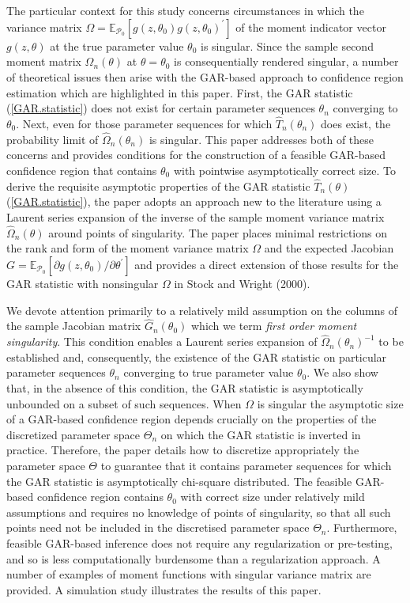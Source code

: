\documentclass[hidelinks, 11 pt, a4paper, pdflatex]{article}
\begin{document}
{  The particular context for this study concerns circumstances in which the variance matrix $\Omega = \mathbb{E}_{\mathcal{P}_0}[g(z,\theta_{0})g(z,\theta_{0})^{\prime}]$ of the moment indicator vector $g(z,\theta)$ at the true parameter value $\theta_0$ is singular. Since the sample second moment matrix $\hat{\Omega}_{n}(\theta)$ at $\theta = \theta_0$ is consequentially rendered singular, a number of theoretical issues then arise with the GAR-based approach to confidence region estimation which are highlighted in this paper. First, the GAR statistic (\ref{GAR.statistic}) does not exist for certain parameter sequences $\theta_n$ converging to $\theta_{0}$. Next, even for those parameter sequences for which $\hat{T}_n(\theta_n)$ does exist, the probability limit of $\hat{\Omega}_{n}(\theta_n)$ is singular. This paper addresses both of these concerns and provides conditions for the construction of a feasible GAR-based confidence region that contains $\theta_{0}$ with pointwise asymptotically correct size. To derive the requisite asymptotic properties of the GAR statistic $\hat{T}_n(\theta)$ (\ref{GAR.statistic}), the paper adopts an approach new to the literature using a Laurent series expansion of the inverse of the sample moment variance matrix $\hat{\Omega}_n(\theta)$ around points of singularity. The paper places minimal restrictions on the rank and form of the moment variance matrix $\Omega$ and the expected Jacobian $G = \mathbb{E}_{\mathcal{P}_0}[\partial g(z,\theta_{0})/ \partial \theta^{\prime}]$ and provides a direct extension of those results for the GAR statistic with nonsingular $\Omega$ in Stock and Wright (2000).

  We devote attention primarily to a relatively mild assumption on the columns of the sample Jacobian matrix $\hat{G}_n(\theta_0)$ which we term \textit{first order moment singularity}. This condition enables a Laurent series expansion of $\hat{\Omega}_{n}(\theta_n)^{-1}$ to be established and, consequently, the existence of the GAR statistic on particular parameter sequences $\theta_n$ converging to true parameter value $\theta_0$. We also show that, in the absence of this condition, the GAR statistic is asymptotically unbounded on a subset of such sequences. When $\Omega$ is singular the asymptotic size of a GAR-based confidence region depends crucially on the properties of the discretized parameter space $\Theta_n$ on which the GAR statistic is inverted in practice. Therefore, the paper details how to discretize appropriately the parameter space $\Theta$ to guarantee that it contains parameter sequences for which the GAR statistic is asymptotically chi-square distributed. The feasible GAR-based confidence region contains $\theta_0$ with correct size under relatively mild assumptions and requires no knowledge of points of singularity, so that all such points need not be included in the discretised parameter space $\Theta_n$. Furthermore, feasible GAR-based inference does not require any regularization or pre-testing, and so is less computationally burdensome than a regularization approach. A number of examples of moment functions with singular variance matrix are provided. A simulation study illustrates the results of this paper.

}
\end{document}
